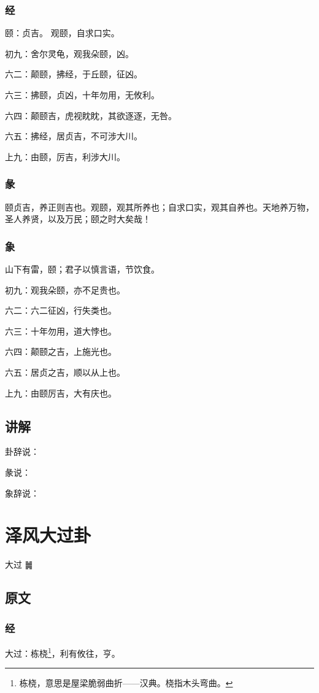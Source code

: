 \documentclass[12pt,oneside]{book}
\begin{document}
\subsection{经}
颐：贞吉。 观颐，自求口实。

初九：舍尔灵龟，观我朵颐，凶。

六二：颠颐，拂经，于丘颐，征凶。

六三：拂颐，贞凶，十年勿用，无攸利。

六四：颠颐吉，虎视眈眈，其欲逐逐，无咎。

六五：拂经，居贞吉，不可涉大川。

上九：由颐，厉吉，利涉大川。

\subsection{彖}
颐贞吉，养正则吉也。观颐，观其所养也；自求口实，观其自养也。天地养万物，圣人养贤，以及万民；颐之时大矣哉！
\subsection{象}
山下有雷，颐；君子以慎言语，节饮食。

初九：观我朵颐，亦不足贵也。

六二：六二征凶，行失类也。

六三：十年勿用，道大悖也。

六四：颠颐之吉，上施光也。

六五：居贞之吉，顺以从上也。

上九：由颐厉吉，大有庆也。

\section{讲解}
卦辞说：

彖说：

象辞说：


\chapter{泽风大过卦}
大过 {\Large ䷛}

\section{原文}

\subsection{经}
大过：栋桡\footnote{栋桡，意思是屋梁脆弱曲折——汉典。桡指木头弯曲。}，利有攸往，亨。
\end{document}
